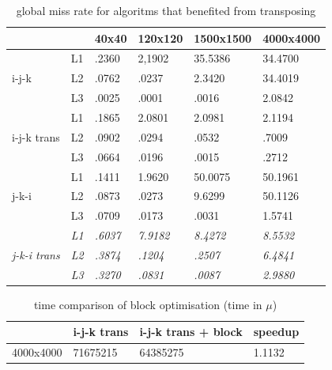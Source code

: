 \documentclass[a4paper]{report}
\begin{document}
\begin{table}[H]
\centering
\begin{tabular}{|l|l|l|l|l|l|}
\hline
\multicolumn{2}{|l|}{}            & 40x40 & 120x120 & 1500x1500 & 4000x4000 \\ \hline
\multirow{3}{*}{i-j-k}       & L1 & .2360 & 2,1902  & 35.5386   & 34.4700   \\ \cline{2-6}
                             & L2 & .0762 & .0237   & 2.3420    & 34.4019   \\ \cline{2-6}
                             & L3 & .0025 & .0001   & .0016     & 2.0842    \\ \hline
\multirow{3}{*}{i-j-k trans} & L1 & .1865 & 2.0801  & 2.0981    & 2.1194    \\ \cline{2-6}
                             & L2 & .0902 & .0294   & .0532     & .7009     \\ \cline{2-6}
                             & L3 & .0664 & .0196   & .0015     & .2712     \\ \hline
\multirow{3}{*}{j-k-i}       & L1 & .1411 & 1.9620  & 50.0075   & 50.1961   \\ \cline{2-6}
                             & L2 & .0873 & .0273   & 9.6299    & 50.1126   \\ \cline{2-6}
                             & L3 & .0709 & .0173   & .0031     & 1.5741    \\ \hline
\multirow{3}{*}{\textit{j-k-i trans}} & \textit{L1} & \textit{.6037} & \textit{7.9182}  & \textit{8.4272}    & \textit{8.5532}    \\ \cline{2-6}
                                      & \textit{L2} & \textit{.3874} & \textit{.1204}   & \textit{.2507}     & \textit{6.4841}    \\ \cline{2-6}
                                      & \textit{L3} & \textit{.3270} & \textit{.0831}   & \textit{.0087}     & \textit{2.9880}    \\ \hline
\end{tabular}
\caption{global miss rate for algoritms that benefited from transposing}
\end{table}

\begin{table}[H]
\centering
\begin{tabular}{|l|l|l|l|}
\hline
          & i-j-k trans & i-j-k trans + block & speedup \\ \hline
4000x4000 & 71675215    & 64385275            & 1.1132  \\ \hline
\end{tabular}
\caption{time comparison of block optimisation (time in $\mu$)}
\end{table}
\end{document}
